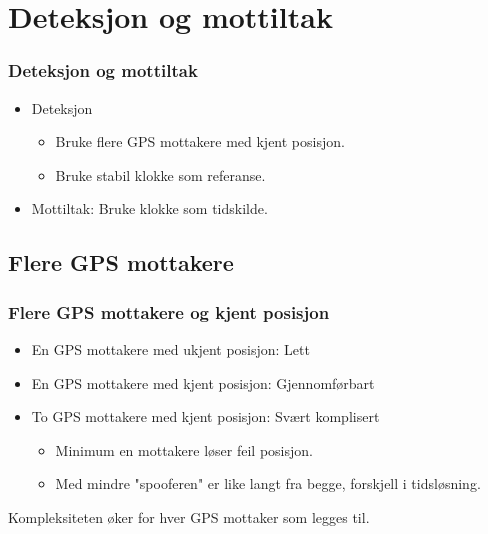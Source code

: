 \documentclass[xcolor=table]{beamer}
\begin{document}
\section{Deteksjon og mottiltak}
\begin{frame}
\frametitle{Deteksjon og mottiltak}
  \begin{itemize}
    \item Deteksjon
    \begin{itemize}
      \item Bruke flere GPS mottakere med kjent posisjon.
      \item Bruke stabil klokke som referanse.
    \end{itemize}
    \item Mottiltak: Bruke klokke som tidskilde.
  \end{itemize}
\end{frame}

\subsection{Flere GPS mottakere}
\begin{frame} 
  \frametitle{Flere GPS mottakere og kjent posisjon}
  \begin{itemize}
    \item En GPS mottakere med ukjent posisjon: Lett
    \item En GPS mottakere med kjent posisjon: Gjennomførbart
    \item To GPS mottakere med kjent posisjon: Svært komplisert
    \begin{itemize}
      \item Minimum en mottakere løser feil posisjon.
      \item Med mindre "spooferen" er like langt fra begge, forskjell i tidsløsning.  
    \end{itemize}
  \end{itemize}
  Kompleksiteten øker for hver GPS mottaker som legges til.
\end{frame}
\end{document}
